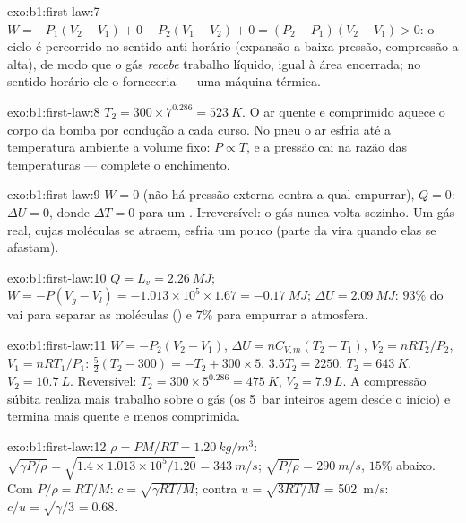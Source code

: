 \begin{solution}{exo:b1:first-law:7}
$W = -P_1(V_2 - V_1) + 0 - P_2(V_1 - V_2) + 0 = (P_2 - P_1)(V_2 - V_1) > 0$:
o ciclo é percorrido no sentido anti-horário (expansão a baixa pressão,
compressão a alta), de modo que o gás \emph{recebe} trabalho líquido, igual à
área encerrada; no sentido horário ele o forneceria --- uma máquina térmica.
\end{solution}

\begin{solution}{exo:b1:first-law:8}
$T_2 = 300 \times 7^{0.286} = \qty{523}{K}$. O ar quente e comprimido aquece o
corpo da bomba por condução a cada curso. No pneu o ar esfria até a
temperatura ambiente a volume fixo: $P \propto T$, e a pressão cai na razão
das temperaturas --- complete o enchimento.
\end{solution}

\begin{solution}{exo:b1:first-law:9}
$W = 0$ (não há pressão externa contra a qual empurrar), $Q = 0$: $\Delta U = 0$,
donde $\Delta T = 0$ para um . Irreversível: o gás nunca volta
sozinho. Um gás real, cujas moléculas se atraem, esfria um pouco (parte da
 vira  quando elas se afastam).
\end{solution}

\begin{solution}{exo:b1:first-law:10}
$Q = L_v = \qty{2.26}{MJ}$; $W = -P(V_g - V_l) = -1.013\times10^5 \times 1.67 =
\qty{-0.17}{MJ}$; $\Delta U = \qty{2.09}{MJ}$: $93\%$ do  vai para
separar as moléculas () e $7\%$ para empurrar a
atmosfera.
\end{solution}

\begin{solution}{exo:b1:first-law:11}
$W = -P_2(V_2 - V_1)$, $\Delta U = nC_{V,m}(T_2 - T_1)$, $V_2 = nRT_2/P_2$, $V_1
= nRT_1/P_1$: $\tfrac52(T_2 - 300) = -T_2 + 300 \times 5$, $3.5T_2 = 2250$,
$T_2 = \qty{643}{K}$, $V_2 = \qty{10.7}{L}$. Reversível: $T_2 = 300 \times
5^{0.286} = \qty{475}{K}$, $V_2 = \qty{7.9}{L}$. A compressão súbita realiza
mais trabalho sobre o gás (os \qty{5}{bar} inteiros agem desde o início) e
termina mais quente e menos comprimida.
\end{solution}

\begin{solution}{exo:b1:first-law:12}
$\rho = PM/RT = \qty{1.20}{kg/m^3}$: $\sqrt{\gamma P/\rho} = \sqrt{1.4 \times
1.013\times10^5/1.20} = \qty{343}{m/s}$; $\sqrt{P/\rho} = \qty{290}{m/s}$, $15\%$
abaixo. Com $P/\rho = RT/M$: $c = \sqrt{\gamma RT/M}$; contra $u = \sqrt{3RT/M}$
= \qty{502}{m/s}: $c/u = \sqrt{\gamma/3} = 0.68$.
\end{solution}

